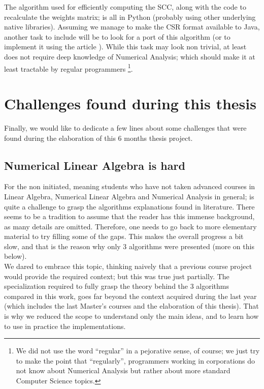 The algorithm used for efficiently computing the SCC, along with the
code to recalculate the weights matrix; is all in Python (probably
using other underlying native libraries). Assuming we manage to make the CSR
format available to Java, another task to include will be to look for
a port of this algorithm (or to implement it using the article
\cite{pearce05}). While this task may look non trivial, at least does
not require deep knowledge of Numerical Analysis; which should make it
at least tractable by regular programmers \footnote{We did not use the
word ``regular'' in a pejorative sense, of course; we just try to make
the point that ``regularly'', programmers working in corporations do
not know about Numerical Analysis but rather about more standard
Computer Science topics.}.

\section{Challenges found during this thesis}

Finally, we would like to dedicate a few lines about some challenges
that were found during the elaboration of this 6 months thesis
project.

\subsection{Numerical Linear Algebra is hard}

For the non initiated, meaning students who have not taken advanced
courses in Linear Algebra,  Numerical Linear Algebra and Numerical
Analysis in general; is quite a challenge to grasp the algorithms
explanations found in literature. There seems to be a tradition to
assume that the reader has this immense background, as many details
are omitted. Therefore, one needs to go back to more elementary
material to try filling some of the gaps. This makes the overall
progress a bit slow, and that is the reason why only 3 algorithms were
presented (more on this below). \\

We dared to embrace this topic, thinking naively that a previous
course project would provide the required context; but this was
true just partially. The specialization required to fully grasp the
theory behind the 3 algorithms compared in this work, goes far beyond
the context acquired during the last year (which includes the last
Master's courses and the elaboration of this thesis). That is why we
reduced the scope to understand only the main ideas, and to learn how
to use in practice the implementations.


